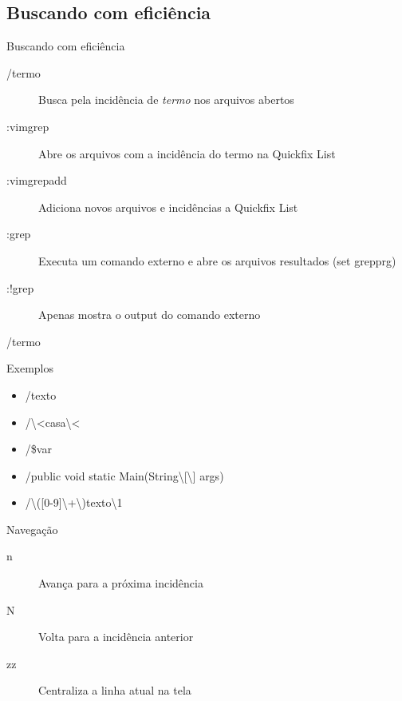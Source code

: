\subsection{Buscando com eficiência}
\begin{frame}{Buscando com eficiência}
	\begin{description}
		\item[/termo] Busca pela incidência de \textit{termo} nos arquivos abertos
		\item[:vimgrep] Abre os arquivos com a incidência do termo na Quickfix List
		\item[:vimgrepadd] Adiciona novos arquivos e incidências a Quickfix List
		\item[:grep] Executa um comando externo e abre os arquivos resultados (set grepprg)
		\item[:!grep] Apenas mostra o output do comando externo
	\end{description}
\end{frame}
\begin{frame}{/termo}
	\begin{block}{Exemplos}
	\begin{itemize}
		\item /texto
		\item /\textbackslash\textless{}casa\textbackslash\textless
		\item /\$var
		\item /public void static Main(String\textbackslash[\textbackslash] args)
		\item /\textbackslash{}([0-9]\textbackslash{}+\textbackslash{})texto\textbackslash{}1
	\end{itemize}
	\end{block}
	\begin{block}{Navegação}
	\begin{description}
		\item[n] Avança para a próxima incidência
		\item[N] Volta para a incidência anterior
		\item[zz] Centraliza a linha atual na tela
	\end{description}
	\end{block}
\end{frame}
